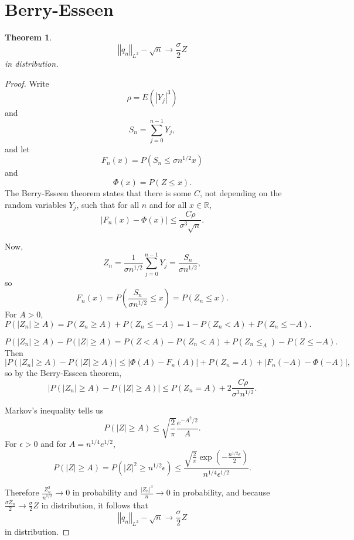 \documentclass{article}
\newcommand{\norm}[1]{\left\Vert #1 \right\Vert}
\newtheorem{theorem}{Theorem}
\begin{document}
\section{Berry-Esseen}
\begin{theorem}
\[
\norm{q_n}_{L^2} - \sqrt{n} \to \frac{\sigma}{2} Z
\]
in distribution.
\end{theorem}
\begin{proof}
Write
\[
\rho = E(|Y_j|^3)
\]
and 
\[
S_n = \sum_{j=0}^{n-1} Y_j,
\]
and let
\[
F_n(x) = P(S_n \leq \sigma n^{1/2} x)
\]
and 
\[
\Phi(x) = P(Z \leq x).
\]
The Berry-Esseen theorem \cite[p.~262, Theorem 5.6.1]{pinsky} states that there is some $C$, not depending on the random variables
$Y_j$, such that for all $n$ and for all $x \in \mathbb{R}$,
\[
|F_n(x) - \Phi(x)| \leq \frac{C\rho}{\sigma^3 \sqrt{n}}.
\]

Now,
\[
Z_n = \frac{1}{\sigma n^{1/2}} \sum_{j=0}^{n-1} Y_j = \frac{S_n}{\sigma n^{1/2}},
\]
so
\[
F_n(x) = P\left( \frac{S_n}{\sigma n^{1/2}} \leq x\right) = P(Z_n \leq x).
\]
For $A>0$,
\[
P(|Z_n| \geq A) = P(Z_n \geq A) + P(Z_n \leq -A)
=1-P(Z_n<A)+P(Z_n \leq -A).
\]

\[
P(|Z_n| \geq A) - P(|Z| \geq A) = P(Z<A) - P(Z_n<A) + P(Z_n \leq _A) - P(Z \leq -A).
\]
Then
\[
|P(|Z_n| \geq A) - P(|Z| \geq A)|
\leq |\Phi(A)-F_n(A)| +P(Z_n = A) + |F_n(-A) - \Phi(-A)|,
\]
so by the Berry-Esseen theorem,
\[
|P(|Z_n| \geq A) - P(|Z| \geq A)| \leq P(Z_n = A) + 2\frac{C\rho}{\sigma^3 n^{1/2}}.
\]

Markov's inequality tells us
\[
P(|Z| \geq A) \leq \sqrt{\frac{2}{\pi}} \frac{e^{-A^2/2}}{A}.
\]
For $\epsilon>0$ and for $A=n^{1/4} e^{1/2}$,
\[
P(|Z| \geq A) = P(|Z|^2 \geq n^{1/2} \epsilon)
\leq \frac{\sqrt{\frac{2}{\pi}} \exp\left(-\frac{n^{1/2} \epsilon}{2} \right)}{n^{1/4} \epsilon^{1/2}}.
\]

Therefore $\frac{Z_n^2}{n^{1/2}} \to 0$ in probability and $\frac{|Z_n|^3}{n} \to 0$ in probability,
and because $\frac{\sigma Z_n}{2} \to \frac{\sigma}{2}Z$ in distribution, it follows that
\[
\norm{q_n}_{L^2} - \sqrt{n} \to \frac{\sigma}{2} Z
\]
in distribution.
\end{proof}
\end{document}
